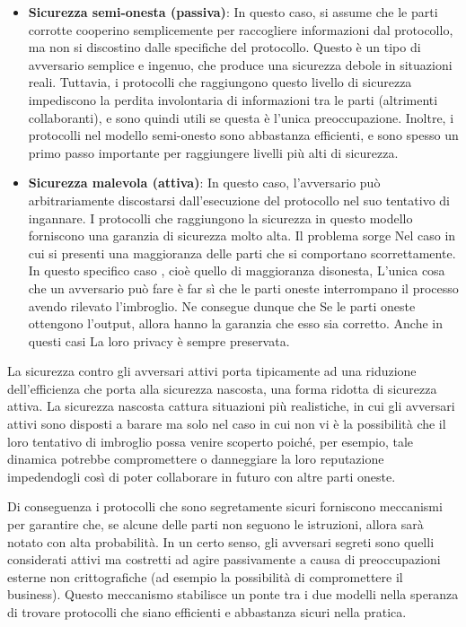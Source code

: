 \documentclass[
]{book}
\providecommand{\tightlist}{%
  \setlength{\itemsep}{0pt}\setlength{\parskip}{0pt}}
\begin{document}
\begin{itemize}
\tightlist
\item
  \textbf{Sicurezza semi-onesta (passiva)}: In questo caso, si assume che le parti corrotte cooperino semplicemente per raccogliere informazioni dal protocollo, ma non si discostino dalle specifiche del protocollo. Questo è un tipo di avversario semplice e ingenuo, che produce una sicurezza debole in situazioni reali. Tuttavia, i protocolli che raggiungono questo livello di sicurezza impediscono la perdita involontaria di informazioni tra le parti (altrimenti collaboranti), e sono quindi utili se questa è l'unica preoccupazione. Inoltre, i protocolli nel modello semi-onesto sono abbastanza efficienti, e sono spesso un primo passo importante per raggiungere livelli più alti di sicurezza.
\item
  \textbf{Sicurezza malevola (attiva)}: In questo caso, l'avversario può arbitrariamente discostarsi dall'esecuzione del protocollo nel suo tentativo di ingannare. I protocolli che raggiungono la sicurezza in questo modello forniscono una garanzia di sicurezza molto alta. Il problema sorge Nel caso in cui si presenti una maggioranza delle parti che si comportano scorrettamente. In questo specifico caso , cioè quello di maggioranza disonesta, L'unica cosa che un avversario può fare è far sì che le parti oneste interrompano il processo avendo rilevato l'imbroglio. Ne consegue dunque che Se le parti oneste ottengono l'output, allora hanno la garanzia che esso sia corretto. Anche in questi casi La loro privacy è sempre preservata.
\end{itemize}

\newpage

La sicurezza contro gli avversari attivi porta tipicamente ad una riduzione dell'efficienza che porta alla sicurezza nascosta, una forma ridotta di sicurezza attiva. La sicurezza nascosta cattura situazioni più realistiche, in cui gli avversari attivi sono disposti a barare ma solo nel caso in cui non vi è la possibilità che il loro tentativo di imbroglio possa venire scoperto poiché, per esempio, tale dinamica potrebbe compromettere o danneggiare la loro reputazione impedendogli così di poter collaborare in futuro con altre parti oneste.

Di conseguenza i protocolli che sono segretamente sicuri forniscono meccanismi per garantire che, se alcune delle parti non seguono le istruzioni, allora sarà notato con alta probabilità. In un certo senso, gli avversari segreti sono quelli considerati attivi ma costretti ad agire passivamente a causa di preoccupazioni esterne non crittografiche (ad esempio la possibilità di compromettere il business). Questo meccanismo stabilisce un ponte tra i due modelli nella speranza di trovare protocolli che siano efficienti e abbastanza sicuri nella pratica.
\end{document}
